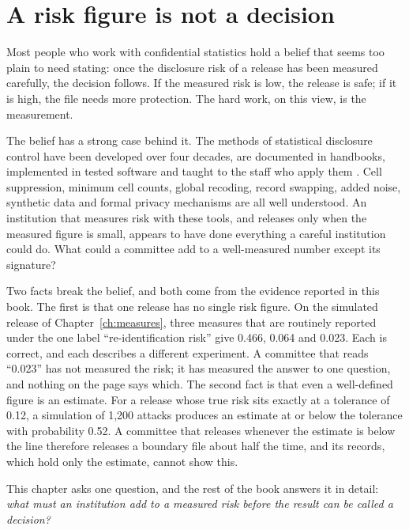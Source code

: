 \chapter{A risk figure is not a decision}\label{ch:decision}

Most people who work with confidential statistics hold a belief that seems too plain to
need stating: once the disclosure risk of a release has been measured carefully, the
decision follows. If the measured risk is low, the release is safe; if it is high, the
file needs more protection. The hard work, on this view, is the measurement.

The belief has a strong case behind it. The methods of statistical disclosure control
have been developed over four decades, are documented in handbooks, implemented in
tested software and taught to the staff who apply them
\citep{willenborg2001,hundepool2012,dwork2014}. Cell suppression, minimum cell counts,
global recoding, record swapping, added noise, synthetic data and formal privacy
mechanisms are all well understood. An institution that measures risk with these tools,
and releases only when the measured figure is small, appears to have done everything a
careful institution could do. What could a committee add to a well-measured number
except its signature?

Two facts break the belief, and both come from the evidence reported in this book. The
first is that one release has no single risk figure. On the simulated release of
Chapter~\ref{ch:measures}, three measures that are routinely reported under the one
label ``re-identification risk'' give 0.466, 0.064 and 0.023.
Each is correct, and each describes a different experiment. A committee that reads ``0.023''
has not measured the risk; it has measured the answer to one question, and nothing on the
page says which. The second fact is that even a well-defined figure is an estimate. For a
release whose true risk sits exactly at a tolerance of 0.12, a simulation of 1,200 attacks
produces an estimate at or below the tolerance with probability 0.52.
A committee that releases whenever the estimate is below the line therefore releases a
boundary file about half the time, and its records, which hold only the estimate, cannot
show this.

This chapter asks one question, and the rest of the book answers it in detail: \emph{what
must an institution add to a measured risk before the result can be called a decision?}

